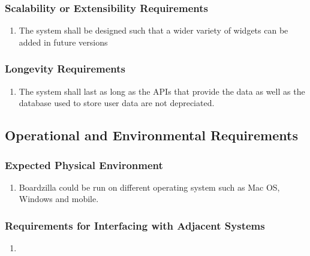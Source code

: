 \documentclass[]{article}
\begin{document}
\subsubsection{Scalability or Extensibility Requirements}
\label{ssub:scalability_or_extensibility_requirements}
\begin{enumerate}[{PR}1. ]
  \item The system shall be designed such that a wider variety of widgets can be added in future versions
\end{enumerate}

\subsubsection{Longevity Requirements}
\label{ssub:longevity_requirements}
\begin{enumerate}[{PR}1. ]
  \item The system shall last as long as the APIs that provide the data as well as the database used to store user data are not depreciated.
\end{enumerate}


\subsection{Operational and Environmental Requirements}
\label{sub:operational_and_environmental_requirements}

\subsubsection{Expected Physical Environment}
\label{ssub:expected_physical_environment}
\begin{enumerate}[{OE}1. ]
  \item Boardzilla could be run on different operating system such as Mac OS, Windows and mobile. 
\end{enumerate}

\subsubsection{Requirements for Interfacing with Adjacent Systems}
\label{ssub:requirements_for_interfacing_with_adjacent_systems}
\begin{enumerate}[{OE}1. ]
  \item 
\end{enumerate}
\end{document}
